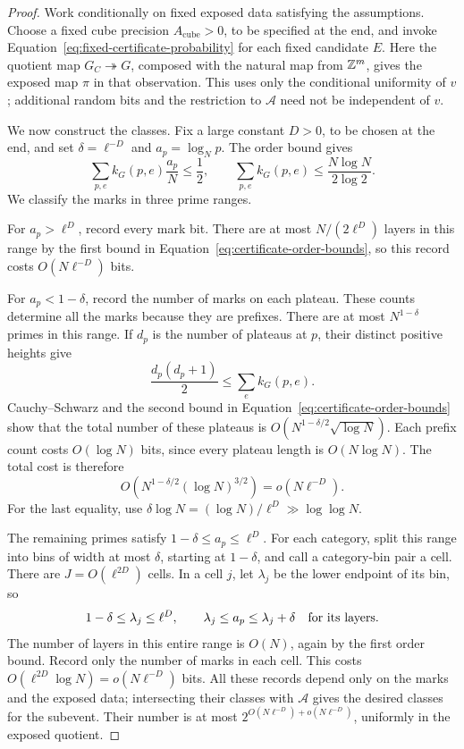 \begin{proof}
Work conditionally on fixed exposed data satisfying the assumptions.
Choose a fixed cube precision \(A_{\mathrm{cube}}>0\), to be specified at
the end, and invoke Equation~\eqref{eq:fixed-certificate-probability} for
each fixed candidate \(E\). Here the quotient map
\(G_C\twoheadrightarrow G\), composed with the natural map from \(\mathbb Z^m\),
gives the exposed map \(\pi\) in that observation. This uses only the
conditional uniformity of \(v\); additional random bits and the restriction
to \(\mathcal A\) need not be independent of \(v\).

We now construct the classes. Fix a large constant \(D>0\), to be
chosen at the end, and set \(\delta=\ell^{-D}\) and
\(a_p=\log_Np\). The order bound gives
\begin{equation}\label{eq:certificate-order-bounds}
 \sum_{p,e}k_G(p,e)\frac{a_p}{N}\le\frac12,
 \qquad
 \sum_{p,e}k_G(p,e)\le\frac{N\log N}{2\log2}.
\end{equation}
We classify the marks in three prime ranges.

For \(a_p>\ell^D\), record every mark bit. There are at most
\(N/(2\ell^D)\) layers in this range by the first bound in
Equation~\eqref{eq:certificate-order-bounds}, so this record costs
\(O(N\ell^{-D})\) bits.

For \(a_p<1-\delta\), record the number of marks on each plateau.
These counts determine all the marks because they are prefixes.
There are at most \(N^{1-\delta}\) primes in this range. If \(d_p\)
is the number of plateaus at \(p\), their distinct positive heights
give
\[
 \frac{d_p(d_p+1)}2\le\sum_e k_G(p,e).
\]
Cauchy--Schwarz and the second bound in
Equation~\eqref{eq:certificate-order-bounds} show that the total number
of these plateaus is
\(O(N^{1-\delta/2}\sqrt{\log N})\). Each prefix count costs
\(O(\log N)\) bits, since every plateau length is \(O(N\log N)\).
The total cost is therefore
\[
 O\!\left(N^{1-\delta/2}(\log N)^{3/2}\right)
       =o(N\ell^{-D}).
\]
For the last equality, use
\(\delta\log N=(\log N)/\ell^D\gg\log\log N\).

The remaining primes satisfy \(1-\delta\le a_p\le\ell^D\).
For each category, split this range into bins of width at most
\(\delta\), starting at \(1-\delta\), and call a category-bin pair
a cell. There are \(J=O(\ell^{2D})\) cells. In a cell \(j\), let
\(\lambda_j\) be the lower endpoint of its bin, so
\[
 1-\delta\le\lambda_j\le\ell^D,
 \qquad \lambda_j\le a_p\le\lambda_j+\delta
 \quad\hbox{for its layers}.
\]
The number of layers in this entire range is \(O(N)\), again by the
first order bound. Record only the number of marks in each cell. This
costs \(O(\ell^{2D}\log N)=o(N\ell^{-D})\) bits. All these records
depend only on the marks and the exposed data; intersecting their classes
with \(\mathcal A\) gives the desired classes for the subevent. Their
number is at most \(2^{O(N\ell^{-D})+o(N\ell^{-D})}\), uniformly in
the exposed quotient.


\end{proof}
